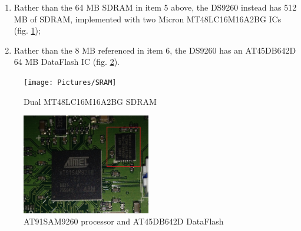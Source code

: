 \documentclass[]{article}
\begin{document}
\begin{enumerate}
	\item Rather than the 64 MB SDRAM in item 5 above, the DS9260 instead has 512 MB of SDRAM, implemented with two Micron MT48LC16M16A2BG ICs (fig. \ref{fig:SDRAM});
	\item Rather than the 8 MB referenced in item 6, the DS9260 has an AT45DB642D 64 MB DataFlash IC (fig. \ref{fig:Flash}).
\end{enumerate}
\begin{figure}
	\centering
	\texttt{[image: Pictures/SRAM]}
	\caption{Dual MT48LC16M16A2BG SDRAM}
	\label{fig:SDRAM}
\end{figure}
\begin{figure}
	\centering
	\includegraphics[width=0.5\textwidth]{Pictures/Flash}
	\caption{AT91SAM9260 processor and AT45DB642D DataFlash}
	\label{fig:Flash}
\end{figure}
\end{document}
